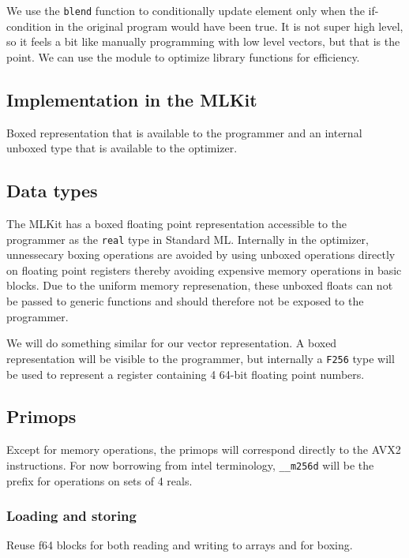 \documentclass{article}
\begin{document}
We use the \verb!blend! function to conditionally update element only when the if-condition in the original program would have been true. It is not super high level, so it feels a bit like manually programming with low level vectors, but that is the point. We can use the module to optimize library functions for efficiency.

\subsection{Implementation in the MLKit}

Boxed representation that is available to the programmer and an internal unboxed type that is available to the optimizer.

\subsection{Data types}

The MLKit has a boxed floating point representation accessible to the programmer as the \verb!real! type in Standard ML. Internally in the optimizer, unnessecary boxing operations are avoided by using unboxed operations directly on floating point registers thereby avoiding expensive memory operations in basic blocks. Due to the uniform memory represenation, these unboxed floats can not be passed to generic functions and should therefore not be exposed to the programmer.

We will do something similar for our vector representation. A boxed representation will be visible to the programmer, but internally a \verb!F256! type will be used to represent a register containing 4 64-bit floating point numbers.

\subsection{Primops}

Except for memory operations, the primops will correspond directly to the AVX2 instructions. For now borrowing from intel terminology, \verb!__m256d! will be the prefix for operations on sets of 4 reals.

\subsubsection{Loading and storing}

Reuse f64 blocks for both reading and writing to arrays and for boxing.
\end{document}

